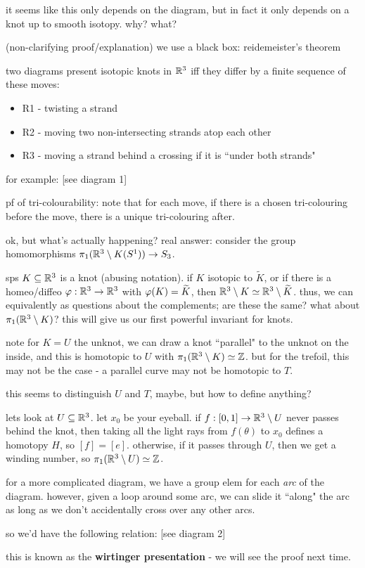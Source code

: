 it seems like this only depends on the diagram, but in fact it only depends on
a knot up to smooth isotopy. why? what?

(non-clarifying proof/explanation) we use a black box: reidemeister's theorem

two diagrams present isotopic knots in $\mathbb{R}^{3}$ iff they differ by a finite
sequence of these moves:
\begin{itemize}
    \item R1 - twisting a strand
    \item R2 - moving two non-intersecting strands atop each other
    \item R3 - moving a strand behind a crossing if it is
        ``under both strands"
\end{itemize}
for example: [see diagram 1]

pf of tri-colourability:
note that for each move, if there is a chosen tri-colouring before the move,
there is a unique tri-colouring after.

ok, but what's actually happening?
real answer: consider the group homomorphisms
$\pi_{1}(\mathbb{R}^{3}\setminus K(S^{1}))\rightarrow S_{3}$.

sps $K\subseteq\mathbb{R}^{3}$ is a knot (abusing notation).
if $K$ isotopic to $\tilde{K}$, or if there is a  homeo/diffeo
$\varphi:\mathbb{R}^{3}\rightarrow\mathbb{R}^{3}$ with $\varphi(K)=\widetilde{K}$, then
$\mathbb{R}^{3}\setminus K\simeq\mathbb{R}^{3}\setminus\widetilde{K}$.
thus, we can equivalently as questions about the complements; are these the same?
what about $\pi_{1}(\mathbb{R}^{3}\setminus K)$?
this will give us our first powerful invariant for knots.

note for $K=U$ the unknot, we can draw a knot ``parallel" to the unknot on the
inside, and this is homotopic to $U$ with $\pi_{1}(\mathbb{R}^{3}\setminus K)\simeq\mathbb{Z}$.
but for the trefoil, this may not be the case - a parallel curve may not be
homotopic to $T$.

this seems to distinguish $U$ and $T$, maybe, but how to define anything?

lets look at $U\subseteq\mathbb{R}^{3}$. let $x_{0}$ be your eyeball.
if $f:[0,1]\rightarrow\mathbb{R}^{3}\setminus U$ never passes behind the knot, then taking all the
light rays from $f(\theta)$ to $x_{0}$ defines a homotopy $H$, so $[f]=[e]$.
otherwise, if it passes through $U$, then we get a winding number, so
$\pi_{1}(\mathbb{R}^{3}\setminus U)\simeq\mathbb{Z}$.

for a more complicated diagram, we have a group elem for each \textit{arc} of the
diagram. however, given a loop around some arc, we can slide it ``along" the arc
as long as we don't accidentally cross over any other arcs.

so we'd have the following relation:
[see diagram 2]

this is known as the \textbf{wirtinger presentation} - we will see the proof
next time.



